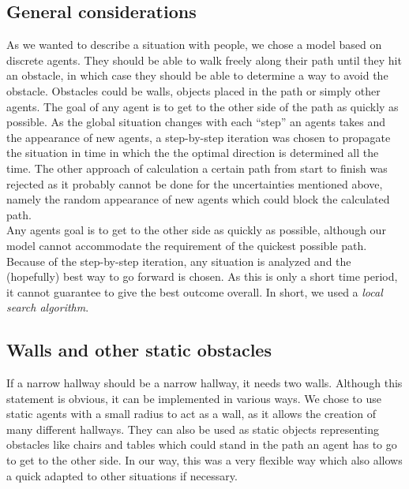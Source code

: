 
\subsection{General considerations}
As we wanted to describe a situation with people, we chose a model based on discrete agents. They should be able to walk freely along their path until they hit an obstacle, in which case they should be able to determine a way to avoid the obstacle. Obstacles could be walls, objects placed in the path or simply other agents. The goal of any agent is to get to the other side of the path as quickly as possible. As the global situation changes with each "`step"' an agents takes and the appearance of new agents, a step-by-step iteration was chosen to propagate the situation in time in which the the optimal direction is determined all the time. The other approach of calculation a certain path from start to finish was rejected as it probably cannot be done for the uncertainties mentioned above, namely the random appearance of new agents which could block the calculated path.\\
Any agents goal is to get to the other side as quickly as possible, although our model cannot accommodate the requirement of the quickest possible path. Because of the step-by-step iteration, any situation is analyzed and the (hopefully) best way to go forward is chosen. As this is only a short time period, it cannot guarantee to give the best outcome overall. In short, we used a \textit{local search algorithm}.

\subsection{Walls and other static obstacles}
If a narrow hallway should be a narrow hallway, it needs two walls. Although this statement is obvious, it can be implemented in various ways. We chose to use static agents with a small radius to act as a wall, as it allows the creation of many different hallways. They can also be used as static objects representing obstacles like chairs and tables which could stand in the path an agent has to go to get to the other side. In our way, this was a very flexible way which also allows a quick adapted to other situations if necessary.

